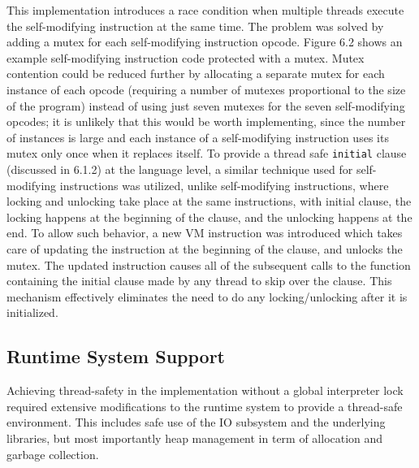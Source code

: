 This implementation introduces a race condition when multiple threads
execute the self-modifying instruction at the same time. The problem was
solved by adding a mutex for each self-modifying instruction
opcode. {\color{red} Figure 6.2} shows an example self-modifying
instruction code protected with a mutex. Mutex contention could be reduced
further by allocating a separate mutex for each instance of each opcode
(requiring a number of mutexes proportional to the size of the program)
instead of using just seven mutexes for the seven self-modifying opcodes;
it is unlikely that this would be worth implementing, since the number of
instances is large and each instance of a self-modifying instruction uses
its mutex only once when it replaces itself.  To provide a thread safe
\texttt{initial} clause (discussed in {\color{red} 6.1.2}) at the language
level, a similar technique used for self-modifying instructions was
utilized, unlike self-modifying instructions, where locking and unlocking
take place at the same instructions, with initial clause, the locking
happens at the beginning of the clause, and the unlocking happens at the
end. To allow such behavior, a new VM instruction was introduced which
takes care of updating the instruction at the beginning of the clause, and
unlocks the mutex. The updated instruction causes all of the subsequent
calls to the function containing the initial clause made by any thread to
skip over the clause.  This mechanism effectively eliminates the need to do
any locking/unlocking after it is initialized.


\subsection{Runtime System Support}
Achieving thread-safety in the implementation without a global interpreter
lock required extensive modifications to the runtime system to provide a
thread-safe environment.  This includes safe use of the IO subsystem and
the underlying libraries, but most importantly heap management in term of
allocation and garbage collection.

